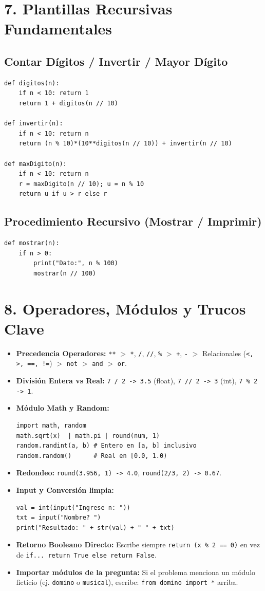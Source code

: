 \documentclass[8pt,twocolumn]{article}
\begin{document}
\section{7. Plantillas Recursivas Fundamentales}
\subsection{Contar Dígitos / Invertir / Mayor Dígito}
\begin{verbatim}
def digitos(n):
    if n < 10: return 1
    return 1 + digitos(n // 10)

def invertir(n):
    if n < 10: return n
    return (n % 10)*(10**digitos(n // 10)) + invertir(n // 10)

def maxDigito(n):
    if n < 10: return n
    r = maxDigito(n // 10); u = n % 10
    return u if u > r else r
\end{verbatim}

\subsection{Procedimiento Recursivo (Mostrar / Imprimir)}
\begin{verbatim}
def mostrar(n):
    if n > 0:
        print("Dato:", n % 100)
        mostrar(n // 100)
\end{verbatim}

\section{8. Operadores, Módulos y Trucos Clave}
\begin{itemize}
    \item \textbf{Precedencia Operadores:} \texttt{**} $>$ \texttt{*}, \texttt{/}, \texttt{//}, \texttt{\%} $>$ \texttt{+}, \texttt{-} $>$ Relacionales (\texttt{<, >, ==, !=}) $>$ \texttt{not} $>$ \texttt{and} $>$ \texttt{or}.
    \item \textbf{División Entera vs Real:} \texttt{7 / 2 -> 3.5} (float), \texttt{7 // 2 -> 3} (int), \texttt{7 \% 2 -> 1}.
    \item \textbf{Módulo Math y Random:}
    \begin{verbatim}
import math, random
math.sqrt(x)  | math.pi | round(num, 1)
random.randint(a, b) # Entero en [a, b] inclusivo
random.random()      # Real en [0.0, 1.0)
    \end{verbatim}
    \item \textbf{Redondeo:} \texttt{round(3.956, 1) -> 4.0}, \texttt{round(2/3, 2) -> 0.67}.
    \item \textbf{Input y Conversión limpia:}
    \begin{verbatim}
val = int(input("Ingrese n: "))
txt = input("Nombre? ")
print("Resultado: " + str(val) + " " + txt)
    \end{verbatim}
    \item \textbf{Retorno Booleano Directo:} Escribe siempre \texttt{return (x \% 2 == 0)} en vez de \texttt{if... return True else return False}.
    \item \textbf{Importar módulos de la pregunta:} Si el problema menciona un módulo ficticio (ej. \texttt{domino} o \texttt{musical}), escribe: \texttt{from domino import *} arriba.
\end{itemize}
\end{document}
